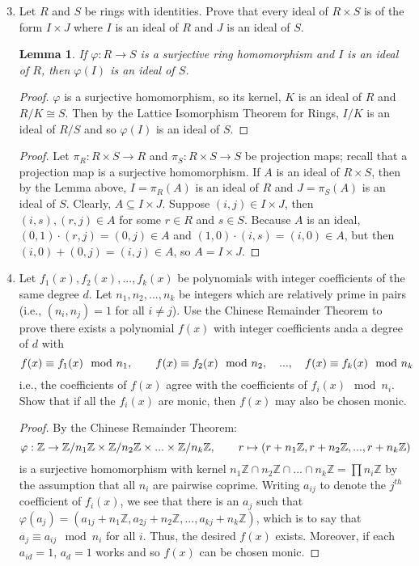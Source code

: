 \documentclass{report}
\newcommand{\Z}{\mathbb{Z}}
\newtheorem{lemma}[theorem]{Lemma}
\begin{document}
\begin{enumerate}
	\setcounter{enumi}{2}
	\item Let $R$ and $S$ be rings with identities. Prove that every ideal of $R\times S$ is of the form $I\times J$ where $I$ is an ideal of $R$ and $J$ is an ideal of $S$.
	\begin{lemma}
	   If $\varphi:R\rightarrow S$ is a surjective ring homomorphism and $I$ is an ideal of $R$, then $\varphi(I)$ is an ideal of $S$.
	\end{lemma}
	\begin{proof}
	   $\varphi$ is a surjective homomorphism, so its kernel, $K$ is an ideal of $R$ and $R/K\cong S$. 
	   Then by the Lattice Isomorphism Theorem for Rings, $I/K$ is an ideal of $R/S$ and so $\varphi(I)$ is an ideal of $S$. 
	\end{proof}
	\begin{proof}
	   Let $\pi_R:R\times S\rightarrow R$ and $\pi_S: R\times S\rightarrow S$ be projection maps; recall that a projection map is a surjective homomorphism. 
	   If $A$ is an ideal of $R\times S$, then by the Lemma above, $I=\pi_R(A)$ is an ideal of $R$ and $J=\pi_S(A)$ is an ideal of $S$.  
	   Clearly, $A\subseteq I\times J$. Suppose $(i,j)\in I\times J$, then $(i,s),(r,j)\in A$ for some $r\in R$ and $s\in S$. 
	   Because $A$ is an ideal, $(0,1)\cdot(r,j)=(0,j)\in A$ and $(1,0)\cdot(i,s)=(i,0)\in A$, but then $(i,0)+(0,j)=(i,j)\in A$, so $A=I\times J$.
	\end{proof}
		
	\setcounter{enumi}{5}
	\item Let $f_1(x),f_2(x),...,f_k(x)$ be polynomials with integer coefficients of the same degree $d$. 
	Let $n_1, n_2, ..., n_k$ be integers which are relatively prime in pairs (i.e., $(n_i,n_j)=1$ for all $i\neq j$). 
	Use the Chinese Remainder Theorem to prove there exists a polynomial $f(x)$ with integer coefficients anda a degree of $d$ with
	$$f(x) \equiv f_1(x) \mod n_1,\hspace{20 pt} f(x)\equiv f_2(x) \mod n_2,\hspace{10 pt}...,\hspace{10 pt} f(x)\equiv f_k(x) \mod n_k$$
	i.e., the coefficients of $f(x)$ agree with the coefficients of $f_i(x) \mod n_i$. Show that if all the $f_i(x)$ are monic, then $f(x)$ may also be chosen monic.
	\begin{proof}
		By the Chinese Remainder Theorem:
		$$\varphi:\Z\rightarrow \Z/n_1\Z\times\Z/n_2\Z\times...\times\Z/n_k\Z, \hspace{20 pt} r\mapsto (r + n_1\Z,r+n_2\Z,...,r+n_k\Z)$$
		is a surjective homomorphism with kernel $n_1\Z\cap n_2\Z\cap...\cap n_k\Z=\prod n_i \Z$ by the assumption that all $n_i$ are pairwise coprime.
		Writing $a_{ij}$ to denote the $j^{th}$ coefficient of $f_i(x)$, we see that there is an $a_j$ such that $\varphi(a_j)=(a_{1j}+n_1\Z,a_{2j}+n_2\Z,...,a_{kj}+n_k\Z)$,
		which is to say that $a_j\equiv a_{ij} \mod n_i$ for all $i$. Thus, the desired $f(x)$ exists.
		Moreover, if each $a_{id}=1$, $a_d=1$ works and so $f(x)$ can be chosen monic.
	\end{proof}
		

\end{enumerate}
\end{document}
